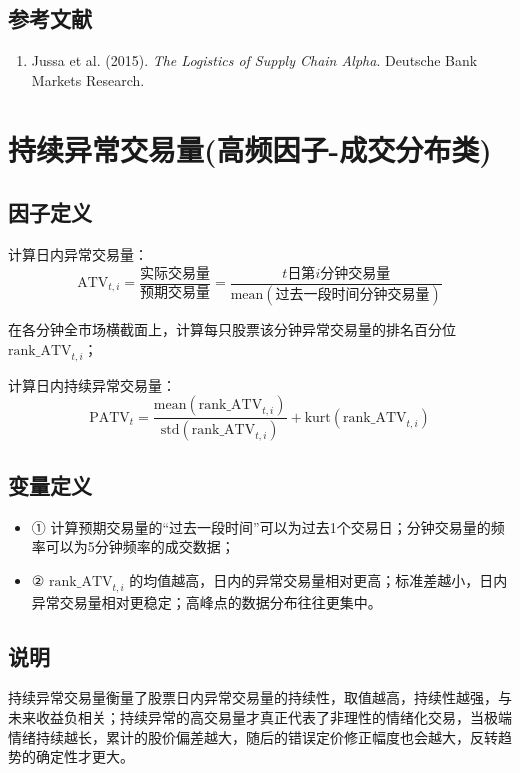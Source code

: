 \documentclass{article}
\begin{document}
\subsection{参考文献}
\begin{enumerate}
    \item Jussa et al. (2015). \textit{The Logistics of Supply Chain Alpha}. Deutsche Bank Markets Research.
\end{enumerate}

\section{持续异常交易量(高频因子-成交分布类)}

\subsection{因子定义}

计算日内异常交易量：
\begin{equation}
    \mathrm{ATV}_{t,i} = \frac{\text{实际交易量}}{\text{预期交易量}} = \frac{t\text{日第}i\text{分钟交易量}}{\mathrm{mean}(\text{过去一段时间分钟交易量})}
\end{equation}

在各分钟全市场横截面上，计算每只股票该分钟异常交易量的排名百分位 \( \mathrm{rank\_ATV}_{t,i} \)；

计算日内持续异常交易量：
\begin{equation}
    \mathrm{PATV}_t = \frac{\mathrm{mean}(\mathrm{rank\_ATV}_{t,i})}{\mathrm{std}(\mathrm{rank\_ATV}_{t,i})} + \mathrm{kurt}(\mathrm{rank\_ATV}_{t,i})
\end{equation}

\subsection{变量定义}
\begin{itemize}
    \item ① 计算预期交易量的“过去一段时间”可以为过去1个交易日；分钟交易量的频率可以为5分钟频率的成交数据；
    \item ② \( \mathrm{rank\_ATV}_{t,i} \) 的均值越高，日内的异常交易量相对更高；标准差越小，日内异常交易量相对更稳定；高峰点的数据分布往往更集中。
\end{itemize}

\subsection{说明}
持续异常交易量衡量了股票日内异常交易量的持续性，取值越高，持续性越强，与未来收益负相关；持续异常的高交易量才真正代表了非理性的情绪化交易，当极端情绪持续越长，累计的股价偏差越大，随后的错误定价修正幅度也会越大，反转趋势的确定性才更大。
\end{document}
